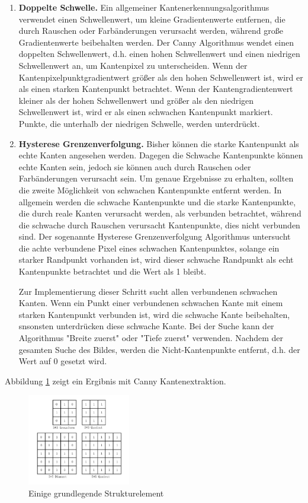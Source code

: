 \begin{enumerate}
	
	\item \textbf{Doppelte Schwelle.} Ein allgemeiner Kantenerkennungsalgorithmus verwendet einen Schwellenwert, um kleine Gradientenwerte entfernen, die durch Rauschen oder Farbänderungen verursacht werden, während große Gradientenwerte beibehalten werden.
Der Canny Algorithmus wendet einen doppelten Schwellenwert, d.h. einen hohen Schwellenwert und einen niedrigen Schwellenwert an, um Kantenpixel zu unterscheiden. Wenn der Kantenpixelpunktgradientwert größer als den hohen Schwellenwert ist, wird er als einen starken Kantenpunkt betrachtet.	Wenn der Kantengradientenwert kleiner als der hohen Schwellenwert und größer als den niedrigen Schwellenwert ist, wird er als einen schwachen Kantenpunkt markiert. Punkte, die unterhalb der niedrigen Schwelle, werden unterdrückt.

	\item \textbf{Hysterese Grenzenverfolgung.} Bisher können die starke Kantenpunkt als echte Kanten angesehen werden. Dagegen die Schwache Kantenpunkte können echte Kanten sein, jedoch sie können auch durch Rauschen oder Farbänderungen verursacht sein. Um genaue Ergebnisse zu erhalten, sollten die zweite Möglichkeit von schwachen Kantenpunkte entfernt werden. In allgemein werden die schwache Kantenpunkte und die starke Kantenpunkte, die durch reale Kanten verursacht werden, als verbunden betrachtet, während die schwache durch Rauschen verursacht Kantenpunkte, dies nicht verbunden sind. Der sogenannte Hysterese Grenzenverfolgung Algorithmus untersucht die achte verbundene Pixel eines schwachen Kantenpunktes, solange ein starker Randpunkt vorhanden ist, wird dieser schwache Randpunkt als echt Kantenpunkte betrachtet und die Wert als 1 bleibt.
	
Zur Implementierung dieser Schritt sucht allen verbundenen schwachen Kanten. Wenn ein Punkt einer verbundenen schwachen Kante mit einem starken Kantenpunkt verbunden ist, wird die schwache Kante beibehalten, snsonsten unterdrücken diese schwache Kante. Bei der Suche kann der Algorithmus "Breite zuerst" oder "Tiefe zuerst" verwenden. Nachdem der gesamten Suche des Bildes, werden die Nicht-Kantenpunkte entfernt, d.h. der Wert auf 0 gesetzt wird.
	
\end{enumerate}

Abbildung \ref{fig:canny} zeigt ein Ergibnis mit Canny Kantenextraktion.

\begin{figure}[H]
 \centering 
  \includegraphics[keepaspectratio,width=0.4\textwidth]{images/4_ZweiteErfahrung/Canny/canny.pdf}
 \caption{Einige grundlegende Strukturelement}
 \label{fig:canny}
\end{figure} 

